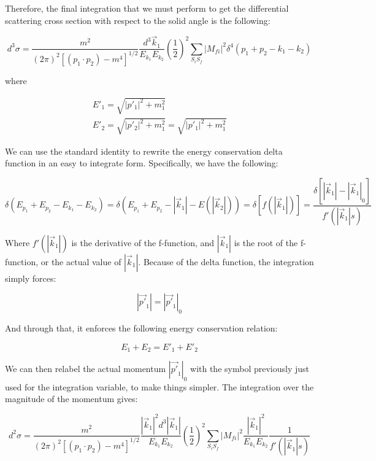 \documentclass[a4]{article}
\begin{document}
    Therefore, the final integration that we must perform to get the differential scattering cross section with respect to the solid angle is the following:

    \begin{equation}
        d^3 \sigma = \frac{m^2}{(2 \pi)^2 [(p_1 \cdot p_2) - m^4]^{1/2}} \frac{d^3 \vec{k}_1}{E_{k_1} E_{k_2}} (\frac{1}{2})^2 \sum_{S_i S_f} |M_{fi}|^2 \delta^4 (p_1 + p_2 - k_1 - k_2)
    \end{equation}

    where

    \begin{eqnarray}
        E'_1 = \sqrt{|p'_1|^2 + m_1^2} \\
        E'_2 = \sqrt{|p'_2|^2 + m_1^2} = \sqrt{|p'_1|^2 + m_1^2}
    \end{eqnarray}

    We can use the standard identity to rewrite the energy conservation delta function in an easy to integrate form. Specifically, we have the following: 

    \begin{equation}
        \delta (E_{p_1} + E_{p_2} - E_{k_1} - E_{k_2}) = \delta (E_{p_1} + E_{p_2} - |\vec{k}_1| - E (|\vec{k}_2|) ) = \delta [f (|\vec{k}_1|)] = \frac{\delta [|\vec{k}_1| - |\vec{k}_1|_0]}{f' (|\vec{k}_1|s)}
    \end{equation}

    Where $f'(|\vec{k}_1|)$ is the derivative of the f-function, and $|\vec{k}_1|$ is the root of the f-function, or the actual value of $|\vec{k}_1|$. Because of the delta function, the integration simply forces:

    \begin{equation}
        |\vec{p'}_1| = |\vec{p'}_1|_0
    \end{equation}

    And through that, it enforces the following energy conservation relation:

    \begin{equation}
        E_1 + E_2 = E'_1 + E'_2
    \end{equation}

    We can then relabel the actual momentum $|\vec{p'}_1|_0$ with the symbol previously just used for the integration variable, to make things simpler. The integration over the magnitude of the momentum gives: 

    \begin{equation}
        d^2 \sigma = \frac{m^2}{(2 \pi)^2 [(p_1 \cdot p_2) - m^4]^{1/2}} \frac{|\vec{k}_1|^2 d^3 |\vec{k}_1|}{E_{k_1} E_{k_2}} (\frac{1}{2})^2 \sum_{S_i S_f} |M_{fi}|^2 \frac{|\vec{k}_1|^2}{E_{k_1} E_{k_2}} \frac{1}{f' (|\vec{k}_1|s)}
    \end{equation}
\end{document}
